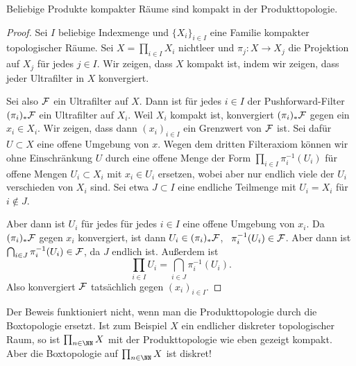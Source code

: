 \begin{theorem}[Tychonoff]\label{thm:tychonoff}
Beliebige Produkte kompakter Räume sind kompakt in der Produkttopologie.
\end{theorem}
\begin{proof}
Sei $I$ beliebige Indexmenge und $\{X_i\}_{i\in I}$ eine Familie kompakter topologischer Räume. Sei $X = \prod_{i\in I} X_i$ nichtleer und $\pi_j\colon X\to X_j$ die Projektion auf $X_j$ für jedes $j\in I$. Wir zeigen, dass $X$ kompakt ist, indem wir zeigen, dass jeder Ultrafilter in $X$ konvergiert.

Sei also $\cal F$ ein Ultrafilter auf $X$. Dann ist für jedes $i\in I$ der Pushforward-Filter $(\pi_i)_*\cal F$ ein Ultrafilter auf $X_i$. Weil $X_i$ kompakt ist, konvergiert $(\pi_i)_*\cal F$ gegen ein $x_i\in X_i$. Wir zeigen, dass dann $(x_i)_{i\in I}$ ein Grenzwert von $\cal F$ ist. Sei dafür $U\subset X$ eine offene Umgebung von $x$. Wegen dem dritten Filteraxiom können wir ohne Einschränkung $U$ durch eine offene Menge der Form $\prod_{i\in I}\pi_i^{-1}(U_i)$ für offene Mengen $U_i\subset X_i$ mit $x_i\in U_i$ ersetzen, wobei aber nur endlich viele der $U_i$ verschieden von $X_i$ sind. Sei etwa $J\subset I$ eine endliche Teilmenge mit $U_i = X_i$ für $i\not\in J$.

Aber dann ist $U_i$ für jedes für jedes $i\in I$ eine offene Umgebung von $x_i$. Da $(\pi_i)_*\cal F$ gegen $x_i$ konvergiert, ist dann $U_i\in (\pi_i)_*\cal F$, \ddh~$\pi_i^{-1}(U_i)\in\cal F$. Aber dann ist $\bigcap_{i\in J} \pi_i^{-1}(U_i)\in\cal F$, da $J$ endlich ist. Außerdem ist
\[
\prod_{i\in I} U_i = \bigcap_{i\in J}\pi_i^{-1}(U_i).
\]
Also konvergiert $\cal F$ tatsächlich gegen $(x_i)_{i\in I}$.
\end{proof}

Der Beweis funktioniert nicht, wenn man die Produkttopologie durch die Boxtopologie ersetzt. Ist zum Beispiel $X$ ein endlicher diskreter topologischer Raum, so ist $\prod_{n\in\NN} X$ mit der Produkttopologie wie eben gezeigt kompakt. Aber die Boxtopologie auf $\prod_{n\in\NN} X$ ist diskret!


